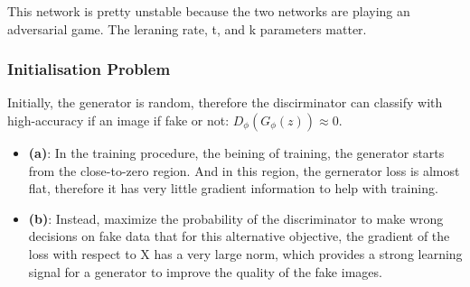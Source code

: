 \documentclass[11pt]{article}
\begin{document}
This network is pretty unstable because the two networks are playing an adversarial game. The leraning rate, t, and k parameters matter.

\subsubsection{Initialisation Problem}

Initially, the generator is random, therefore the discirminator can classify with high-accuracy if an image if fake or not: $D_\phi(G_\phi(z))\approx 0$.

\begin{figure}[H]
    \centering
\end{figure}

\begin{itemize}
    \item \textbf{(a)}: In the training procedure, the beining of training, the generator starts from the close-to-zero region. And in this region, the gernerator loss is almost flat, therefore it has very little gradient information to help with training.
    \item \textbf{(b)}: Instead, maximize the probability of the discriminator to make wrong decisions on fake data that for this alternative objective, the gradient of the loss with respect to X has a very large norm, which provides a strong learning signal for a generator to improve the quality of the fake images.
\end{itemize}
\end{document}
